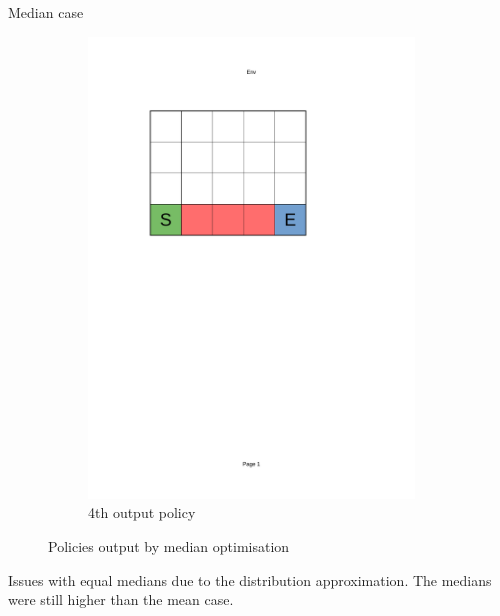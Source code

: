 \documentclass[10pt]{beamer}
\begin{document}
\begin{frame}{Median case}
\begin{figure}[!ht]
\begin{subfigure}{0.24\textwidth}
                \includegraphics[page=9, trim = 40mm 40mm 70mm 165mm, clip, width=0.95\textwidth]{figures/personal_work/policies.pdf}
            \caption{4th output policy}
        \end{subfigure}
            \caption{Policies output by median optimisation}
    \end{figure}

    Issues with equal medians due to the distribution approximation. The medians were still higher than the mean case.
    
\end{frame}
\end{document}
